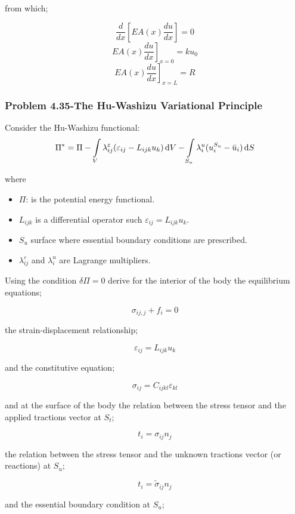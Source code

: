 from which;

\[\frac{d}{{dx}}\left[ {EA(x)\frac{{du}}{{dx}}} \right] = 0\]
\[{\left. {EA(x)\frac{{du}}{{dx}}} \right]_{x = 0}} = k{u_0}\]
\[{\left. {EA(x)\frac{{du}}{{dx}}} \right]_{x = L}} = R\]





\subsubsection*{Problem 4.35-The Hu-Washizu Variational Principle}
Consider the Hu-Washizu functional:
\begin{equation}
\Pi^* = \Pi  - \int\limits_V \lambda_{ij}^\varepsilon (\varepsilon_{ij} - L_{ijk} u_k)\dd{V}  - \int\limits_{S_u} \lambda_i^u(u_i^{S_u} - \bar{ u}_i)\dd{S}
\label{eq:Hu}
\end{equation}

where
\begin{itemize}
\item $\Pi$: is the potential energy functional.
\item $L_{ijk}$ is a differential operator such $\varepsilon_{ij} = L_{ijk} u_k$.
\item $S_u$ surface where essential boundary conditions are prescribed.
\item $\lambda_{ij}^\varepsilon $ and $\lambda_i^u$ are Lagrange multipliers.
\end{itemize}

Using the condition $\delta \Pi = 0$ derive for the interior of the body the equilibrium equations;

\[{\sigma _{ij,j}} + {f_i} = 0\]

the strain-displacement relationship;

\[{\varepsilon _{ij}} = {L_{ijk}}{u_k}\]

and the constitutive equation;

\[{\sigma _{ij}} = {C_{ijkl}}{\varepsilon _{kl}}\]

and at the surface of the body the relation between the stress tensor and the applied tractions vector at $S_t$;

\[{t_i} = {\sigma _{ij}}{n_j}\]

the relation between the stress tensor and the unknown tractions vector (or reactions) at $S_u$; 

\[{t_i} = {{\tilde \sigma }_{ij}}{n_j}\]

and the essential boundary condition at $S_u$;

